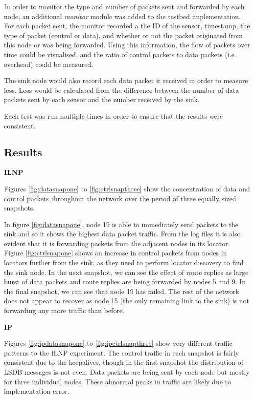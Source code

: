 \documentclass[12pt]{article}
\begin{document}
In order to monitor the type and number of packets sent and forwarded by each node, an additional \emph{monitor} module was added to the testbed implementation. For each packet sent, the monitor recorded a the ID of the sensor, timestamp, the type of packet (control or data), and whether or not the packet originated from this node or was being forwarded. Using this information, the flow of packets over time could be visualised, and the ratio of control packets to data packets (i.e. overhead) could be measured. 

The sink node would also record each data packet it received in order to measure loss. Loss would be calculated from the difference between the number of data packets sent by each sensor and the number received by the sink. 

Each test was run multiple times in order to ensure that the results were consistent.

\subsection{Results}

\textbf{ILNP}

\noindent Figures \ref{fig:datasnapone} to \ref{fig:ctrlsnapthree} show the concentration of data and control packets throughout the network over the period of three equally sized snapshots.

In figure \ref{fig:datasnapone}, node 19 is able to immediately send packets to the sink and so it shows the highest data packet traffic. From the log files it is also evident that it is forwarding packets from the adjacent nodes in its locator. Figure \ref{fig:ctrlsnapone} shows an increase in control packets from nodes in locators further from the sink, as they need to perform locator discovery to find the sink node. In the next snapshot, we can see the effect of route replies as large burst of data packets and route replies are being forwarded by nodes 5 and 9. In the final snapshot, we can see that node 19 has failed. The rest of the network does not appear to recover as node 15 (the only remaining link to the sink) is not forwarding any more traffic than before.

\medskip
\noindent\textbf{IP}

\noindent Figures \ref{fig:ipdatasnapone} to \ref{fig:ipctrlsnapthree} show very different traffic patterns to the ILNP experiment. The control traffic in each snapshot is fairly consistent due to the keepalives, though in the first snapshot the distribution of LSDB messages is not even. Data packets are being sent by each node but mostly for three individual nodes. These abnormal peaks in traffic are likely due to implementation error.
\end{document}

